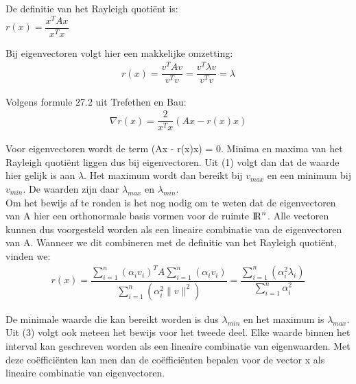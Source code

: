 De definitie van het Rayleigh quoti\"ent is:\\

$r(x) = \dfrac{x^{T}Ax}{x^{T}x}$

Bij eigenvectoren volgt hier een makkelijke omzetting:\\

\begin{equation}
\begin{gathered}
r(x) = \dfrac{v^{T}Av}{v^{T}v} = \dfrac{v^{T}\lambda v}{v^{T}v} = \lambda
\end{gathered}
\end{equation}

Volgens formule 27.2 uit Trefethen en Bau:\\

\begin{equation}
\begin{gathered}
\nabla r(x) = \dfrac{2}{x^{T}x}(Ax - r(x)x)
\end{gathered}
\end{equation}

Voor eigenvectoren wordt de term (Ax - r(x)x) = 0. Minima en maxima van het Rayleigh quoti\"ent liggen dus bij eigenvectoren. Uit (1) volgt dan dat de waarde hier gelijk is aan $\lambda$. Het maximum wordt dan bereikt bij $v_{max}$ en een minimum bij $v_{min}$. De waarden zijn daar $\lambda_{max}$ en $\lambda_{min}$.\\

Om het bewijs af te ronden is het nog nodig om te weten dat de eigenvectoren van A hier een orthonormale basis vormen voor de ruimte ${\rm I\!R}^{n}$. Alle vectoren kunnen dus voorgesteld worden als een lineaire combinatie van de eigenvectoren van A. Wanneer we dit combineren met de definitie van het Rayleigh quoti\"ent, vinden we:\\

\begin{equation}
\begin{gathered}
r(x) = \dfrac{\sum_{i=1}^{n}(\alpha_{i}v_{i})^{T}A\sum_{i=1}^{n}(\alpha_{i}v_{i})}{\sum_{i=1}^{n}(\alpha_{i}^{2}\|v\|^{2})} = \dfrac{\sum_{i=1}^{n}(\alpha_{i}^{2}\lambda_{i})}{\sum_{i=1}^{n}\alpha_{i}^{2}}
\end{gathered}
\end{equation}

De minimale waarde die kan bereikt worden is dus $\lambda_{min}$ en het maximum is $\lambda_{max}$. Uit (3) volgt ook meteen het bewijs voor het tweede deel. Elke waarde binnen het interval kan geschreven worden als een lineaire combinatie van eigenwaarden. Met deze co\"effici\"enten kan men dan de co\"effici\"enten bepalen voor de vector x als lineaire combinatie van eigenvectoren.\\